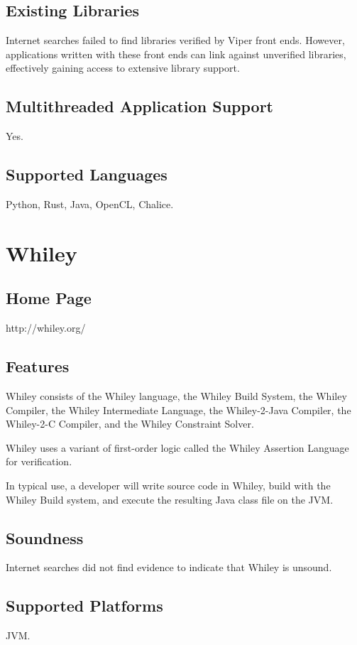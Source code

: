 \documentclass[12pt,openany,a4paper]{book}
\begin{document}
	\subsection{Existing Libraries}
		Internet searches failed to find libraries verified by Viper front ends. However, applications written with these front ends can link against unverified libraries, effectively gaining access to extensive library support.
	\subsection{Multithreaded Application Support}
	Yes.
	\subsection{Supported Languages}
	Python, Rust, Java, OpenCL, Chalice.





\section{Whiley}
	\subsection{Home Page}
	http://whiley.org/
	
	\subsection{Features}
	Whiley consists of the Whiley language, the Whiley Build System, the Whiley Compiler, the Whiley Intermediate Language, the Whiley-2-Java Compiler, the Whiley-2-C Compiler, and the Whiley Constraint Solver\cite{10.1007/978-3-319-02654-1_13}. 
	
	Whiley uses a variant of first-order logic called the Whiley Assertion Language for verification.
	
	In typical use, a developer will write source code in Whiley, build with the Whiley Build system, and execute the resulting Java class file on the JVM.  

	\subsection{Soundness}
	Internet searches did not find evidence to indicate that Whiley is unsound.
	\subsection{Supported Platforms}
	JVM.
\end{document}
